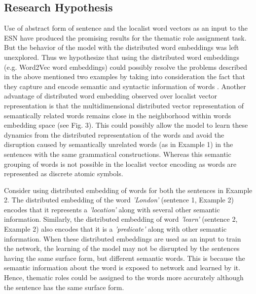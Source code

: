\subsection{Research Hypothesis}

Use of abstract form of sentence and the localist word vectors as an input to the ESN have produced the promising results for the thematic role assignment task\cite{xavier:2013:RT, tra:xavier_wermter:2014}. But the behavior of the model with the distributed word embeddings was left unexplored. Thus we hypothesize that using the distributed word embeddings (e.g. Word2Vec word embeddings) could possibly resolve the problems described in the above mentioned two examples by taking into consideration the fact that they capture and encode semantic and syntactic information of words \cite{w2v:mikolov_2013_distributed, w2v:regularities_in_word_representations}. Another advantage of distributed word embedding observed over localist vector representation is that the multidimensional distributed vector representation of semantically related words remains close in the neighborhood within words embedding space (see Fig. 3). This could possibly allow the model to learn these dynamics from the distributed representation of the words and avoid the disruption caused by semantically unrelated words (as in Example 1) in the sentences with the same grammatical constructions. Whereas this semantic grouping of words is not possible in the localist vector encoding as words are represented as discrete atomic symbols.

Consider using distributed embedding of words for both the sentences in Example 2. The distributed embedding of the word \textit{'London'} (sentence 1, Example 2) encodes that it represents a \textit{'location'} along with several other semantic information. Similarly, the distributed embedding of word \textit{'learn'} (sentence 2, Example 2) also encodes that it is a \textit{'predicate'} along with other semantic information. When these distributed embeddings are used as an input to train the network, the learning of the model may not be disrupted by the sentences having the same surface form, but different semantic words. This is because the semantic information about the word is exposed to network and learned by it. Hence, thematic roles could be assigned to the words more accurately although the sentence has the same surface form.
